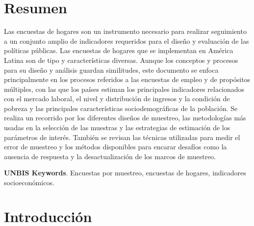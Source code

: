 \cleardoublepage %




\hypertarget{resumen}{%
\chapter*{Resumen}\label{resumen}}


Las encuestas de hogares son un instrumento necesario para realizar seguimiento a un conjunto amplio de indicadores requeridos para el diseño y evaluación de las políticas públicas. Las encuestas de hogares que se implementan en América Latina son de tipo y características diversas. Aunque los conceptos y procesos para su diseño y análisis guardan similitudes, este documento se enfoca principalmente en los procesos referidos a las encuestas de empleo y de propósitos múltiples, con las que los países estiman los principales indicadores relacionados con el mercado laboral, el nivel y distribución de ingresos y la condición de pobreza y las principales características sociodemográficas de la población. Se realiza un recorrido por los diferentes diseños de muestreo, las metodologías más usadas en la selección de las muestras y las estrategias de estimación de los parámetros de interés. También se revisan las técnicas utilizadas para medir el error de muestreo y los métodos disponibles para encarar desafíos como la ausencia de respuesta y la desactualización de los marcos de muestreo.

\textbf{UNBIS Keywords}. Encuestas por muestreo, encuestas de hogares, indicadores socioeconómicos.

\hypertarget{introduccion}{%
\chapter{Introducción}\label{introduccion}}


